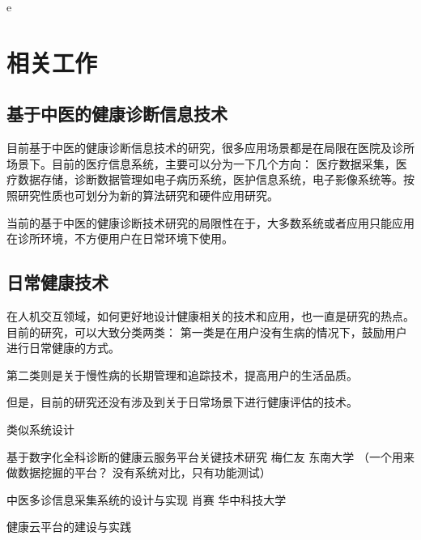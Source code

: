 e\chapter{相关工作}

\section{基于中医的健康诊断信息技术}

目前基于中医的健康诊断信息技术的研究，很多应用场景都是在局限在医院及诊所场景下。目前的医疗信息系统，主要可以分为一下几个方向：
医疗数据采集，医疗数据存储，诊断数据管理如电子病历系统，医护信息系统，电子影像系统等。按照研究性质也可划分为新的算法研究和硬件应用研究。


当前的基于中医的健康诊断技术研究的局限性在于，大多数系统或者应用只能应用在诊所环境，不方便用户在日常环境下使用。

\section{日常健康技术}

在人机交互领域，如何更好地设计健康相关的技术和应用，也一直是研究的热点。目前的研究，可以大致分类两类： 第一类是在用户没有生病的情况下，鼓励用户进行日常健康的方式。

第二类则是关于慢性病的长期管理和追踪技术，提高用户的生活品质。






但是，目前的研究还没有涉及到关于日常场景下进行健康评估的技术。






类似系统设计

基于数字化全科诊断的健康云服务平台关键技术研究 梅仁友 东南大学 （一个用来做数据挖掘的平台？  没有系统对比，只有功能测试）

中医多诊信息采集系统的设计与实现 肖赛 华中科技大学

健康云平台的建设与实践

